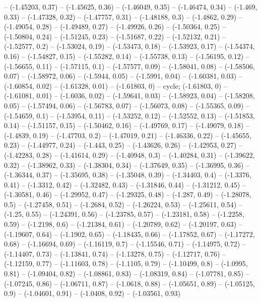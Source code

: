 -- (-1.45203, 0.37)
-- (-1.45625, 0.36)
-- (-1.46049, 0.35)
-- (-1.46474, 0.34)
-- (-1.469, 0.33)
-- (-1.47328, 0.32)
-- (-1.47757, 0.31)
-- (-1.48188, 0.3)
-- (-1.4862, 0.29)
-- (-1.49054, 0.28)
-- (-1.49489, 0.27)
-- (-1.49926, 0.26)
-- (-1.50364, 0.25)
-- (-1.50804, 0.24)
-- (-1.51245, 0.23)
-- (-1.51687, 0.22)
-- (-1.52132, 0.21)
-- (-1.52577, 0.2)
-- (-1.53024, 0.19)
-- (-1.53473, 0.18)
-- (-1.53923, 0.17)
-- (-1.54374, 0.16)
-- (-1.54827, 0.15)
-- (-1.55282, 0.14)
-- (-1.55738, 0.13)
-- (-1.56195, 0.12)
-- (-1.56655, 0.11)
-- (-1.57115, 0.1)
-- (-1.57577, 0.09)
-- (-1.58041, 0.08)
-- (-1.58506, 0.07)
-- (-1.58972, 0.06)
-- (-1.5944, 0.05)
-- (-1.5991, 0.04)
-- (-1.60381, 0.03)
-- (-1.60854, 0.02)
-- (-1.61328, 0.01)
-- (-1.61803, 0)
-- cycle;
\drawBand (-1.61803, 0)
-- (-1.61081, 0.01)
-- (-1.6036, 0.02)
-- (-1.59641, 0.03)
-- (-1.58923, 0.04)
-- (-1.58208, 0.05)
-- (-1.57494, 0.06)
-- (-1.56783, 0.07)
-- (-1.56073, 0.08)
-- (-1.55365, 0.09)
-- (-1.54659, 0.1)
-- (-1.53954, 0.11)
-- (-1.53252, 0.12)
-- (-1.52552, 0.13)
-- (-1.51853, 0.14)
-- (-1.51157, 0.15)
-- (-1.50462, 0.16)
-- (-1.49769, 0.17)
-- (-1.49079, 0.18)
-- (-1.4839, 0.19)
-- (-1.47703, 0.2)
-- (-1.47019, 0.21)
-- (-1.46336, 0.22)
-- (-1.45655, 0.23)
-- (-1.44977, 0.24)
-- (-1.443, 0.25)
-- (-1.43626, 0.26)
-- (-1.42953, 0.27)
-- (-1.42283, 0.28)
-- (-1.41614, 0.29)
-- (-1.40948, 0.3)
-- (-1.40284, 0.31)
-- (-1.39622, 0.32)
-- (-1.38962, 0.33)
-- (-1.38304, 0.34)
-- (-1.37649, 0.35)
-- (-1.36995, 0.36)
-- (-1.36344, 0.37)
-- (-1.35695, 0.38)
-- (-1.35048, 0.39)
-- (-1.34403, 0.4)
-- (-1.3376, 0.41)
-- (-1.3312, 0.42)
-- (-1.32482, 0.43)
-- (-1.31846, 0.44)
-- (-1.31212, 0.45)
-- (-1.30581, 0.46)
-- (-1.29952, 0.47)
-- (-1.29325, 0.48)
-- (-1.287, 0.49)
-- (-1.28078, 0.5)
-- (-1.27458, 0.51)
-- (-1.2684, 0.52)
-- (-1.26224, 0.53)
-- (-1.25611, 0.54)
-- (-1.25, 0.55)
-- (-1.24391, 0.56)
-- (-1.23785, 0.57)
-- (-1.23181, 0.58)
-- (-1.2258, 0.59)
-- (-1.2198, 0.6)
-- (-1.21384, 0.61)
-- (-1.20789, 0.62)
-- (-1.20197, 0.63)
-- (-1.19607, 0.64)
-- (-1.1902, 0.65)
-- (-1.18435, 0.66)
-- (-1.17852, 0.67)
-- (-1.17272, 0.68)
-- (-1.16694, 0.69)
-- (-1.16119, 0.7)
-- (-1.15546, 0.71)
-- (-1.14975, 0.72)
-- (-1.14407, 0.73)
-- (-1.13841, 0.74)
-- (-1.13278, 0.75)
-- (-1.12717, 0.76)
-- (-1.12159, 0.77)
-- (-1.11603, 0.78)
-- (-1.1105, 0.79)
-- (-1.10499, 0.8)
-- (-1.0995, 0.81)
-- (-1.09404, 0.82)
-- (-1.08861, 0.83)
-- (-1.08319, 0.84)
-- (-1.07781, 0.85)
-- (-1.07245, 0.86)
-- (-1.06711, 0.87)
-- (-1.0618, 0.88)
-- (-1.05651, 0.89)
-- (-1.05125, 0.9)
-- (-1.04601, 0.91)
-- (-1.0408, 0.92)
-- (-1.03561, 0.93)
